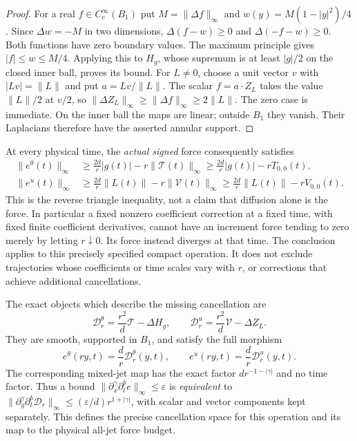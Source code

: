 \begin{proof}
For a real $f\in C_c^\infty(B_1)$ put
$M=\|\Delta f\|_\infty$ and $w(y)=M(1-|y|^2)/4$.
Since $\Delta w=-M$ in two dimensions, $\Delta(f-w)\geq0$
and $\Delta(-f-w)\geq0$.  Both functions have zero boundary
values.  The maximum principle gives $|f|\leq w\leq M/4$.
Applying this to $H_g$, whose supremum is at least $|g|/2$
on the closed inner ball, proves its bound.
For $L\ne0$, choose a unit vector $v$ with $|Lv|=\|L\|$
and put $a=Lv/\|L\|$.  The scalar $f=a\cdot Z_L$ takes
the value $\|L\|/2$ at $v/2$, so
$\|\Delta Z_L\|_\infty\geq\|\Delta f\|_\infty\geq2\|L\|$.
The zero case is immediate.  On the inner ball the maps are
linear; outside $B_1$ they vanish.  Their Laplacians therefore
have the asserted annular support.
\end{proof}

At every physical time, the \emph{actual signed} force consequently
satisfies
\begin{align}
 \|e^\theta(t)\|_\infty
 &\geq\frac{2d}{r}|g(t)|-r\|\mathcal T(t)\|_\infty
  \geq\frac{2d}{r}|g(t)|-rT_{0,0}(t),\nonumber\\
 \|e^u(t)\|_\infty
 &\geq\frac{2d}{r}\|L(t)\|-r\|\mathcal V(t)\|_\infty
  \geq\frac{2d}{r}\|L(t)\|-rV_{0,0}(t).
 \label{ifs:force-lower-bounds}
\end{align}
This is the reverse triangle inequality, not a claim that diffusion
alone is the force.  In particular a fixed nonzero coefficient
correction at a fixed time, with fixed finite coefficient derivatives,
cannot have an increment force tending to zero merely by letting
$r\downarrow0$.  Its force instead diverges at that time.
The conclusion applies to this precisely specified compact operation.
It does not exclude trajectories whose coefficients or time scales
vary with $r$, or corrections that achieve additional cancellations.

The exact objects which describe the missing cancellation are
\begin{equation}\label{ifs:defect-maps}
 \mathcal D^\theta_r=\frac{r^2}{d}\mathcal T-\Delta H_g,\qquad
 \mathcal D^u_r=\frac{r^2}{d}\mathcal V-\Delta Z_L.
\end{equation}
They are smooth, supported in $B_1$, and satisfy the full morphism
\[
 e^\theta(ry,t)=\frac d r\mathcal D^\theta_r(y,t),\qquad
 e^u(ry,t)=\frac d r\mathcal D^u_r(y,t).
\]
The corresponding mixed-jet map has the exact factor
$d r^{-1-|\gamma|}$ and no time factor.  Thus a bound
$\|\partial_x^\gamma\partial_t^b e\|_\infty\leq\varepsilon$
is \emph{equivalent} to
$\|\partial_y^\gamma\partial_t^b\mathcal D_r\|_\infty
\leq(\varepsilon/d)r^{1+|\gamma|}$, with scalar and vector
components kept separately.
This defines the precise cancellation space for this operation
and its map to the physical all-jet force budget.

